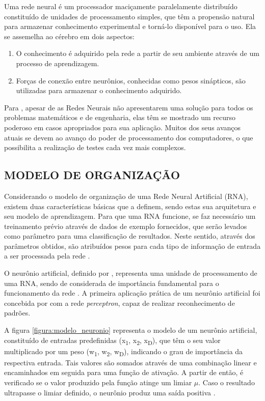 \begin{citacao}
	Uma rede neural é um processador maciçamente paralelamente distribuído constituído de unidades de processamento simples, que têm a propensão natural para armazenar conhecimento experimental e torná-lo disponível para o uso. Ela se assemelha ao cérebro em dois aspectos:
	\begin{enumerate}[leftmargin=4.7cm, topsep=0cm]
	    \item O conhecimento é adquirido pela rede a partir de seu ambiente através de um processo de aprendizagem.
	    \item Forças de conexão entre neurônios, conhecidas como pesos sinápticos, são utilizadas para armazenar o conhecimento adquirido.
	\end{enumerate}
\end{citacao}

Para , apesar de as Redes Neurais não apresentarem uma solução para todos os problemas matemáticos e de engenharia, elas têm se mostrado um recurso poderoso em casos apropriados para sua aplicação. Muitos dos seus avanços atuais se devem ao avanço do poder de processamento dos computadores, o que possibilita a realização de testes cada vez mais complexos.

\subsection{MODELO DE ORGANIZAÇÃO}

Considerando o modelo de organização de uma Rede Neural Artificial (RNA), existem duas características básicas que a definem, sendo estas sua arquitetura e seu modelo de aprendizagem. Para que uma RNA funcione, se faz necessário um treinamento prévio através de dados de exemplo fornecidos, que serão levados como parâmetro para uma classificação de resultados. Neste sentido, através dos parâmetros obtidos, são atribuídos pesos para cada tipo de informação de entrada a ser processada pela rede \cite{thomas2019}.

O neurônio artificial, definido por , representa uma unidade de processamento de uma RNA, sendo de considerada de importância fundamental para o funcionamento da rede \cite{haykin2007redes}. A primeira aplicação prática de um neurônio artificial foi concebida por  com a rede \textit{perceptron}, capaz de realizar reconhecimento de padrões.

A figura \ref{figura:modelo_neuronio} representa o modelo de um neurônio artificial, constituído de entradas predefinidas (x\textsubscript{1}, x\textsubscript{2}, x\textsubscript{D}), que têm o seu valor multiplicado por um peso (w\textsubscript{1}, w\textsubscript{2}, w\textsubscript{D}), indicando o grau de importância da respectiva entrada. Tais valores são somados através de uma combinação linear e encaminhados em seguida para uma função de ativação. A partir de então, é verificado se o valor produzido pela função atinge um limiar \(\mu\). Caso o resultado ultrapasse o limiar definido, o neurônio produz uma saída positiva \cite{thomas2019}.

